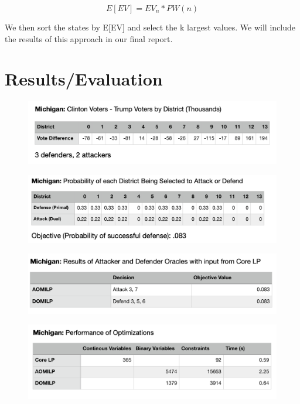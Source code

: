 \documentclass[letterpaper]{article} %
\begin{document}
\begin{equation}
E[EV] = EV_n*PW(n)
\end{equation}

We then sort the states by E[EV] and select the k largest values. We will include the results of this approach in our final report.

\section{Results/Evaluation}

\begin{figure}
    \includegraphics[width=\linewidth]{michigan_votes}
    \label{michigan_votes}
\end{figure}

\begin{figure}
    \includegraphics[width=\linewidth]{michigan_probs}
    \label{michigan_probs}
\end{figure}

\begin{figure}
    \includegraphics[width=\linewidth]{michigan_oracles}
    \label{michigan_oracles}
\end{figure}

\begin{figure}
    \includegraphics[width=\linewidth]{michigan_perfs}
    \label{michigan_perfs}
\end{figure}
\end{document}
